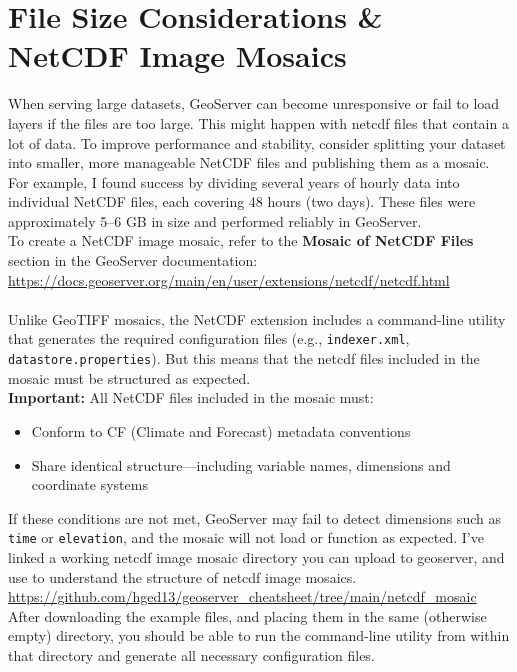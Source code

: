\documentclass{article}
\begin{document}
\section{File Size Considerations \& NetCDF Image Mosaics}

When serving large datasets, GeoServer can become unresponsive or fail to load layers if the files are too large. This might happen with netcdf files that contain a lot of data. To improve performance and stability, consider splitting your dataset into smaller, more manageable NetCDF files and publishing them as a mosaic. \\

For example, I found success by dividing several years of hourly data into individual NetCDF files, each covering 48 hours (two days). These files were approximately 5–6 GB in size and performed reliably in GeoServer. \\

To create a NetCDF image mosaic, refer to the \textbf{Mosaic of NetCDF Files} section in the GeoServer documentation:  
\url{https://docs.geoserver.org/main/en/user/extensions/netcdf/netcdf.html}
\\ \\
Unlike GeoTIFF mosaics, the NetCDF extension includes a command-line utility that generates the required configuration files (e.g., \texttt{indexer.xml}, \texttt{datastore.properties}). But this means that the netcdf files included in the mosaic must be structured as expected.  \\

\textbf{Important:} All NetCDF files included in the mosaic must:
\begin{itemize}
  \item Conform to CF (Climate and Forecast) metadata conventions
  \item Share identical structure—including variable names, dimensions and coordinate systems
\end{itemize}

If these conditions are not met, GeoServer may fail to detect dimensions such as \texttt{time} or \texttt{elevation}, and the mosaic will not load or function as expected.
I’ve linked a working netcdf image mosaic directory you can upload to geoserver, and use to understand the structure of netcdf image mosaics. \\
\url{https://github.com/hged13/geoserver_cheatsheet/tree/main/netcdf_mosaic} \\

After downloading the example files, and placing them in the same (otherwise empty) directory, you should be able to run the command-line utility from within that directory and generate all necessary configuration files. \\
\end{document}
